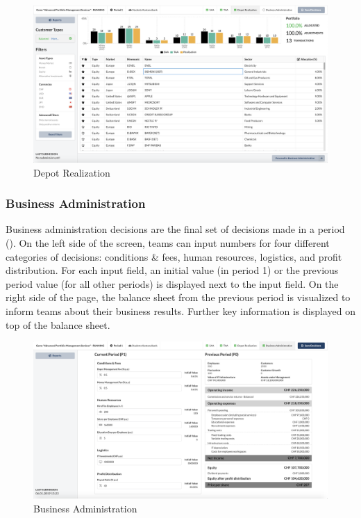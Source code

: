 \begin{figure}[h!]
  \centering
  \includegraphics[scale=0.2]{img/application-overview/teams/05_depot_realization.png}
  \caption{Depot Realization}
  \label{fig:depot_realization}
\end{figure}

\subsubsection{Business Administration}
Business administration decisions are the final set of decisions made in a period (). On the left side of the screen, teams can input numbers for four different categories of decisions: conditions \& fees, human resources, logistics, and profit distribution. For each input field, an initial value (in period 1) or the previous period value (for all other periods) is displayed next to the input field. On the right side of the page, the balance sheet from the previous period is visualized to inform teams about their business results. Further key information is displayed on top of the balance sheet.
\begin{figure}[h!]
  \centering
  \includegraphics[scale=0.2]{img/application-overview/teams/06_business.png}
  \caption{Business Administration}
  \label{fig:business_admin}
\end{figure}


